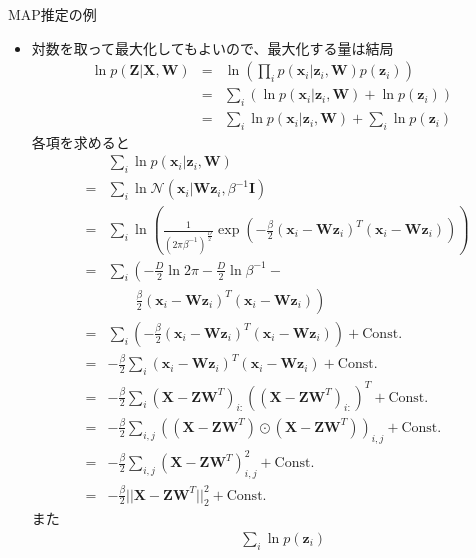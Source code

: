 \documentclass[dvipdfmx,notheorems,t]{beamer}
\begin{document}
\begin{frame}{MAP推定の例}
\begin{itemize}
\begin{itemize}
		\item 対数を取って最大化してもよいので、最大化する量は結局
		\begin{eqnarray}
			\ln p(\bm{Z} | \bm{X}, \bm{W}) &=& \ln \left( \prod_i p(\bm{x}_i | \bm{z}_i, \bm{W}) p(\bm{z}_i) \right) \\
			&=& \sum_i \left( \ln p(\bm{x}_i | \bm{z}_i, \bm{W}) + \ln p(\bm{z}_i) \right) \\
			&=& \sum_i \ln p(\bm{x}_i | \bm{z}_i, \bm{W}) + \sum_i \ln p(\bm{z}_i)
		\end{eqnarray}
		各項を求めると
		\begin{eqnarray}
			&& \sum_i \ln p(\bm{x}_i | \bm{z}_i, \bm{W}) \nonumber \\
			&=& \sum_i \ln \mathcal{N}(\bm{x}_i | \bm{W} \bm{z}_i, \beta^{-1} \bm{I}) \nonumber \\
			&=& \sum_i \ln \left( \frac{1}{(2\pi \beta^{-1})^\frac{D}{2}} \exp \left( -\frac{\beta}{2} \left( \bm{x}_i - \bm{W} \bm{z}_i \right)^T \left( \bm{x}_i - \bm{W} \bm{z}_i \right) \right) \right) \nonumber \\
			&=& \sum_i \left( -\frac{D}{2} \ln 2\pi - \frac{D}{2} \ln \beta^{-1} - \right. \nonumber \\
			&& \qquad \left. \frac{\beta}{2} \left( \bm{x}_i - \bm{W} \bm{z}_i \right)^T \left( \bm{x}_i - \bm{W} \bm{z}_i \right) \right) \nonumber \\
			&=& \sum_i \left( -\frac{\beta}{2} \left( \bm{x}_i - \bm{W} \bm{z}_i \right)^T \left( \bm{x}_i - \bm{W} \bm{z}_i \right) \right) + \mathrm{Const.} \nonumber \\
			&=& -\frac{\beta}{2} \sum_i \left( \bm{x}_i - \bm{W} \bm{z}_i \right)^T \left( \bm{x}_i - \bm{W} \bm{z}_i \right) + \mathrm{Const.} \nonumber \\
			&=& -\frac{\beta}{2} \sum_i \left( \bm{X} - \bm{Z} \bm{W}^T \right)_{i:} \left( \left( \bm{X} - \bm{Z} \bm{W}^T \right)_{i:} \right)^T + \mathrm{Const.} \\
			&=& -\frac{\beta}{2} \sum_{i, j} \left( \left( \bm{X} - \bm{Z} \bm{W}^T \right) \odot \left( \bm{X} - \bm{Z} \bm{W}^T \right) \right)_{i, j} + \mathrm{Const.} \\
			&=& -\frac{\beta}{2} \sum_{i, j} \left( \bm{X} - \bm{Z} \bm{W}^T \right)_{i, j}^2 + \mathrm{Const.} \\
			&=& -\frac{\beta}{2} || \bm{X} - \bm{Z} \bm{W}^T ||_2^2 + \mathrm{Const.}
		\end{eqnarray}
		また
		\begin{eqnarray}
			&& \sum_i \ln p(\bm{z}_i) \nonumber \\

\end{eqnarray}
\end{itemize}
\end{itemize}
\end{frame}
\end{document}
